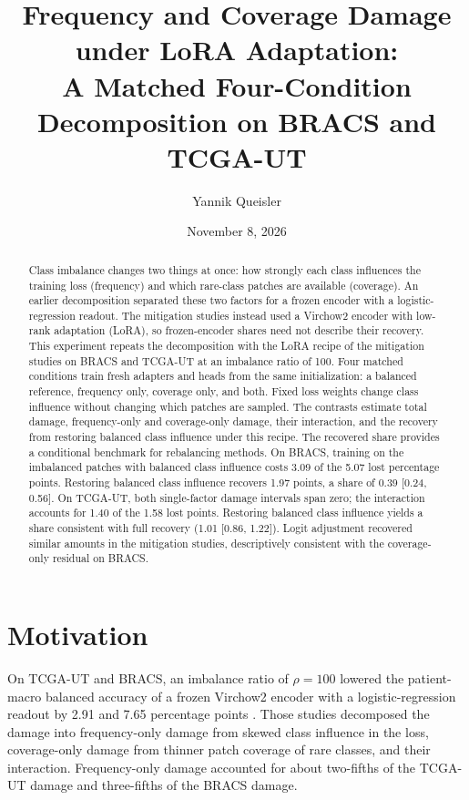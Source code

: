 \documentclass[11pt]{article}
\title{Frequency and Coverage Damage under {LoRA} Adaptation:\\A Matched Four-Condition Decomposition on {BRACS} and {TCGA-UT}}
\author{Yannik Queisler}
\date{November 8, 2026}
\begin{document}
\raggedbottom
{}
\setlength{\emergencystretch}{2em}
\maketitle
\begin{abstract}
\noindent Class imbalance changes two things at once: how strongly each class influences the training loss (frequency) and which rare-class patches are available (coverage). An earlier decomposition separated these two factors for a frozen encoder with a logistic-regression readout. The mitigation studies instead used a Virchow2 encoder with low-rank adaptation (LoRA), so frozen-encoder shares need not describe their recovery. This experiment repeats the decomposition with the LoRA recipe of the mitigation studies on BRACS and TCGA-UT at an imbalance ratio of 100. Four matched conditions train fresh adapters and heads from the same initialization: a balanced reference, frequency only, coverage only, and both. Fixed loss weights change class influence without changing which patches are sampled. The contrasts estimate total damage, frequency-only and coverage-only damage, their interaction, and the recovery from restoring balanced class influence under this recipe. The recovered share provides a conditional benchmark for rebalancing methods. On BRACS, training on the imbalanced patches with balanced class influence costs 3.09 of the 5.07 lost percentage points. Restoring balanced class influence recovers 1.97 points, a share of 0.39 [0.24, 0.56]. On TCGA-UT, both single-factor damage intervals span zero; the interaction accounts for 1.40 of the 1.58 lost points. Restoring balanced class influence yields a share consistent with full recovery (1.01 [0.86, 1.22]). Logit adjustment recovered similar amounts in the mitigation studies, descriptively consistent with the coverage-only residual on BRACS.
\end{abstract}

\section{Motivation}
\label{sec:motivation}
On TCGA-UT and BRACS, an imbalance ratio of $\rho=100$ lowered the patient-macro balanced accuracy of a frozen Virchow2 encoder \citep{zimmermann2024virchow2} with a logistic-regression readout by 2.91 and 7.65 percentage points \citep{queisler2026causeTcga,queisler2026causeBracs}. Those studies decomposed the damage into frequency-only damage from skewed class influence in the loss, coverage-only damage from thinner patch coverage of rare classes, and their interaction. Frequency-only damage accounted for about two-fifths of the TCGA-UT damage and three-fifths of the BRACS damage.
\end{document}
